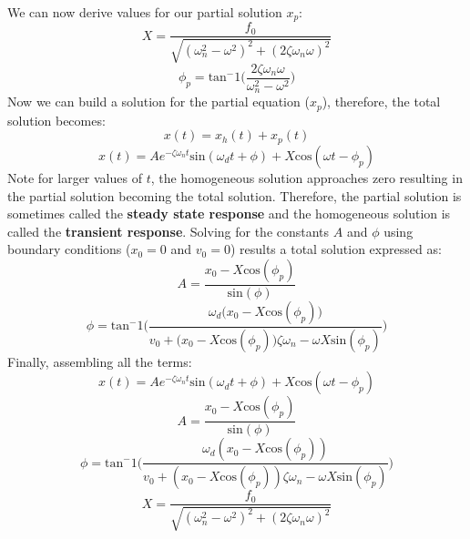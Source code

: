 \documentclass[12pt,letter]{article}
\numberwithin{ex}{section} %
\numberwithin{re}{section} %
\begin{document}
			We can now derive values for our partial solution $x_p$:
			\begin{equation}
				X = \frac{f_0}{\sqrt{(\omega_n^2 - \omega^2)^2 +  (2\zeta \omega_n \omega)^2}} 
			\end{equation}	
			\begin{equation}
				\phi_p = \text{tan}^-1\bigg(\frac{2\zeta \omega_n \omega}{\omega_n^2 - \omega^2}\bigg)
			\end{equation}				
			Now we can build a solution for the partial equation ($x_p$), therefore, the total solution becomes:
			\begin{equation}
				x(t) = x_h(t) + x_p(t)
			\end{equation}
			\begin{equation}
				x(t) = Ae^{-\zeta \omega_n t}\text{sin}(\omega_d t + \phi) +  X \text{cos}(\omega t - \phi_p)
			\end{equation}				
			Note for larger values of $t$, the homogeneous solution approaches zero resulting in the partial solution becoming the total solution. Therefore, the partial solution is sometimes called the \textbf{steady state response} and the homogeneous solution is called the \textbf{transient response}. Solving for the constants $A$ and $\phi$ using boundary conditions ($x_0=0$ and $v_0=0$) results a total solution expressed as:
			\begin{equation}
				A = \frac{x_0 -X \text{cos}(\phi_p)}{\text{sin}(\phi)}
			\end{equation}			 
			\begin{equation}
				\phi =  \text{tan}^-1\bigg(\frac{\omega_d \big( x_0 -X \text{cos}(\phi_p)\big)}{v_0 + \big(x_0 - X \text{cos}(\phi_p)\big) \zeta \omega_n - \omega X \text{sin}(\phi_p) }\bigg)
			\end{equation}			
			Finally, assembling all the terms:
			\begin{equation}
				x(t) = Ae^{-\zeta \omega_n t}\text{sin}(\omega_d t + \phi) +  X \text{cos}(\omega t - \phi_p)
			\end{equation}
			\begin{equation}
				A = \frac{x_0 -X \text{cos}(\phi_p)}{\text{sin}(\phi)}
			\end{equation}			 
			\begin{equation}
				\phi =  \text{tan}^-1\bigg(\frac{\omega_d ( x_0 -X \text{cos}(\phi_p))}{v_0 + (x_0 - X \text{cos}(\phi_p)) \zeta \omega_n - \omega X \text{sin}(\phi_p) }\bigg)
			\end{equation}	
			\begin{equation}
				X = \frac{f_0}{\sqrt{(\omega_n^2 - \omega^2)^2 +  (2\zeta \omega_n \omega)^2}} 
			\end{equation}	
\end{document}
